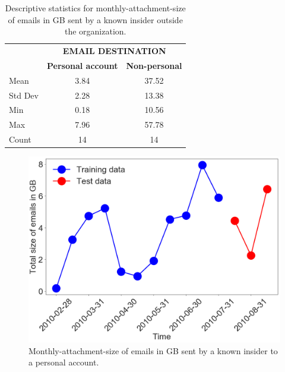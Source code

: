 \documentclass[letterpaper]{article}
\begin{document}
\begin{table}[h]
\caption{Descriptive statistics for monthly-attachment-size of emails in GB sent by a known insider outside the organization.}
\label{tab:descriptive-stats-emails}
\begin{center}
\begin{tabular}{l@{\qquad}cc}
  \toprule
  \multirow{2}{*}{\raisebox{-\heavyrulewidth}{\bf STATISTIC}} & \multicolumn{2}{c}{\bf EMAIL DESTINATION} \\
  \cmidrule{2-3}
  & {\bf Personal account} & {\bf Non-personal} \\
  \midrule
  Mean & 3.84 & 37.52  \\
  Std Dev & 2.28 & 13.38  \\
  Min & 0.18 & 10.56  \\
  Max & 7.96 & 57.78  \\
  Count & 14 & 14  \\
  \bottomrule
\end{tabular}
\end{center}
\end{table}

\begin{figure}[h]
\begin{center}
\includegraphics[width=\linewidth]{figures/data-emails2.png}
\caption{Monthly-attachment-size of emails in GB sent by a known insider to a personal account.}
\label{fig:data-emails}
\end{center}
\end{figure}
\end{document}
